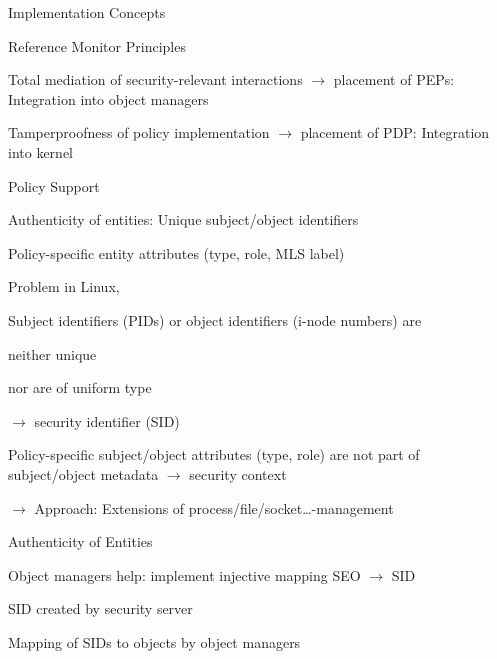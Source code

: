 \documentclass[a4paper]{article}
\begin{document}
\begin{multicols}{3}
    Implementation Concepts
    \begin{itemize*}
        \item Reference Monitor Principles
        \begin{itemize*}
            \item Total mediation of security-relevant interactions $\rightarrow$ placement of PEPs: Integration into object managers
            \item Tamperproofness of policy implementation $\rightarrow$ placement of PDP: Integration into kernel
        \end{itemize*}
        \item Policy Support
        \begin{itemize*}
            \item Authenticity of entities: Unique subject/object identifiers
            \item Policy-specific entity attributes (type, role, MLS label)
        \end{itemize*}
        \item Problem in Linux,
        \begin{itemize*}
            \item Subject identifiers (PIDs) or object identifiers (i-node numbers) are
            \begin{itemize*}
                \item neither unique
                \item nor are of uniform type
            \end{itemize*}
            \item[$\rightarrow$] security identifier (SID)
            \item Policy-specific subject/object attributes (type, role) are not part of subject/object metadata $\rightarrow$ security context
            \item[$\rightarrow$] Approach: Extensions of process/file/socket\dots -management
        \end{itemize*}
    \end{itemize*}

    Authenticity of Entities
    \begin{itemize*}
        \item Object managers help: implement injective mapping SEO $\rightarrow$ SID
        \begin{itemize*}
            \item SID created by security server
            \item Mapping of SIDs to objects by object managers
        \end{itemize*}
    \end{itemize*}


\end{multicols}
\end{document}
